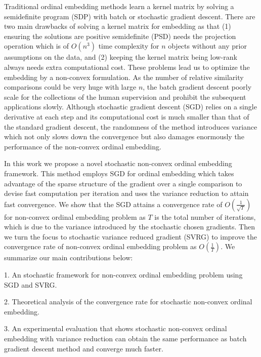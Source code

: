 \documentclass[letterpaper]{article}
\begin{document}
		Traditional ordinal embedding methods learn a kernel matrix by solving a semidefinite program (SDP) with batch \cite{agarwal2007generalized,tamuz2011adaptiive,vandermaaten2012stochastic} or stochastic \cite{doi:10.1137/1.9781611974010.31} gradient descent. There are two main drawbacks of solving a kernel matrix for embedding as that (1) ensuring the solutions are positive semidefinite (PSD) needs the projection operation which is of $O(n^3)$ time complexity for $n$ objects without any prior assumptions on the data, and (2) keeping the kernel matrix being low-rank always needs extra computational cost. These problems lead us to optimize the embedding by a non-convex formulation. As the number of relative similarity comparisons could be very huge with large $n$, the batch gradient descent poorly scale for the collections of the human supervision and prohibit the subsequent applications slowly. Although stochastic gradient descent (SGD) relies on a single derivative at each step and its computational cost is much smaller than that of the standard gradient descent, the randomness of the method introduces variance which not only slows down the convergence but also damages enormously the performance of the non-convex ordinal embedding.
		
		In this work we propose a novel stochastic non-convex ordinal embedding framework. This method employs SGD for ordinal embedding which takes advantage of the sparse structure of the gradient over a single comparison to devise fast computation per iteration and uses the variance reduction to attain fast convergence. We show that the SGD attains a convergence rate of $O(\frac{1}{\sqrt{T}})$ for non-convex ordinal embedding problem as $T$ is the total number of iterations, which is due to the variance introduced by the stochastic chosen gradients. Then we turn the focus to stochastic variance reduced gradient (SVRG) \cite{rie2013accelerating} to improve the convergence rate of non-convex ordinal embedding problem as $O(\frac{1}{T})$. We summarize our main contributions below:
		
		1. An stochastic framework for non-convex ordinal embedding problem using SGD and SVRG.
		
		2. Theoretical analysis of the convergence rate for stochastic non-convex ordinal embedding.

		3. An experimental evaluation that shows stochastic non-convex ordinal embedding with variance reduction can obtain the same performance as batch gradient descent method and converge much faster.
\end{document}
